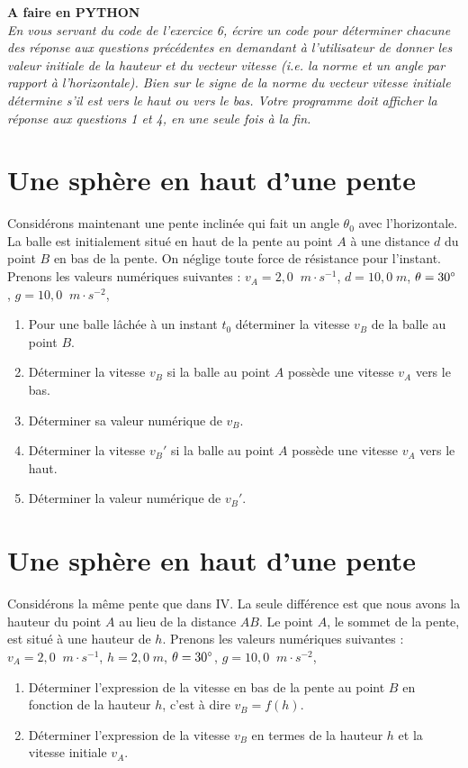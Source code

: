 \documentclass[11pt,a4paper]{article}
\newcommand{\mps}{\; m\cdot s^{-1}}
\newcommand{\mpss}{\; m\cdot s^{-2}}
\newenvironment{python}
 {\begin{shaded} \textbf{A faire en PYTHON}\\ \itshape } { \end{shaded}}
\begin{document}
\begin{python}
En vous servant du code de l'exercice 6, écrire un code pour déterminer chacune des réponse aux questions précédentes en demandant à l'utilisateur de donner les valeur initiale de la hauteur et du vecteur vitesse (i.e. la norme et un angle par rapport à l'horizontale). Bien sur le signe de la norme du vecteur vitesse initiale détermine s'il est vers le haut ou vers le bas. 
Votre programme doit afficher la réponse aux questions 1 et 4, en une seule fois à la fin. 
\end{python}

\section{Une sphère en haut d'une pente}

Considérons maintenant une pente inclinée qui fait un angle $\theta_0$ avec l'horizontale. La balle est initialement situé en haut de la pente au point $A$ à une distance $d$ du point $B$ en bas de la pente. On néglige toute force de résistance pour l'instant. Prenons les valeurs numériques suivantes : $v_A=2,0\; \mps $, $d=10,0\; m$, $\theta=30\degree $, $g=10,0 \; \mpss$, 
\begin{enumerate}
    \item Pour une balle lâchée à un instant $t_0$ déterminer la vitesse $v_B$ de la balle au point $B$. 
    \item Déterminer la vitesse $v_B$ si la balle au point $A$ possède une vitesse $v_A$ vers le bas.
    \item Déterminer sa valeur numérique de $v_B$. 
    \item Déterminer la vitesse $v_B'$ si la balle au point $A$ possède une vitesse $v_A$ vers le haut.
    \item Déterminer la valeur numérique de $v_B '$.
    
\end{enumerate}
\section{Une sphère en haut d'une pente}

Considérons la même pente que dans IV. La seule différence est que nous avons la hauteur du point $A$ au lieu de la distance $AB$. Le point $A$, le sommet de la pente, est situé à une hauteur de $h$. Prenons les valeurs numériques suivantes : $v_A=2,0\; \mps $, $h=2,0 \; m$, $\theta=30\degree$, $g=10,0 \; \mpss$, 
\begin{enumerate}
    \item Déterminer l'expression de la vitesse en bas de la pente au point $B$ en fonction de la hauteur $h$, c'est à dire $v_B=f(h)$. 
    \item Déterminer l'expression de la vitesse $v_B$ en termes de la hauteur $h$ et la vitesse initiale $v_A$. 
    
\end{enumerate}
\end{document}
